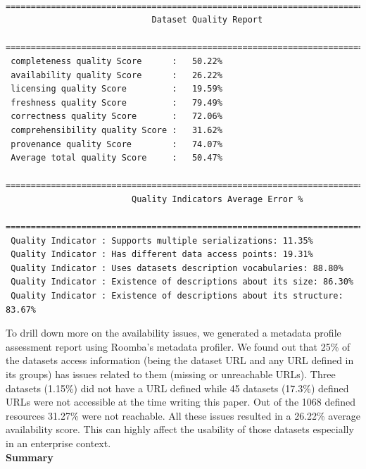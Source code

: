 \documentclass[onecolumn, crcready]{../../Tools/LaTEX/iosart2c}
\begin{document}
\begin{lstlisting}
 =================================================================================
                             Dataset Quality Report
 =================================================================================
 completeness quality Score      :   50.22%
 availability quality Score      :   26.22%
 licensing quality Score         :   19.59%
 freshness quality Score         :   79.49%
 correctness quality Score       :   72.06%
 comprehensibility quality Score :   31.62%
 provenance quality Score        :   74.07%
 Average total quality Score     :   50.47%
 =================================================================================
                         Quality Indicators Average Error %
 =================================================================================
 Quality Indicator : Supports multiple serializations: 11.35%
 Quality Indicator : Has different data access points: 19.31%
 Quality Indicator : Uses datasets description vocabularies: 88.80%
 Quality Indicator : Existence of descriptions about its size: 86.30%
 Quality Indicator : Existence of descriptions about its structure: 83.67%
\end{lstlisting}

To drill down more on the availability issues, we generated a metadata profile assessment report using Roomba's metadata profiler. We found out that 25\% of the datasets access information (being the dataset URL and any URL defined in its groups) has issues related to them (missing or unreachable URLs).
Three datasets (1.15\%) did not have a URL defined while 45 datasets (17.3\%) defined URLs were not accessible at the time writing this paper. Out of the 1068 defined resources 31.27\% were not reachable. All these issues resulted in a 26.22\% average availability score. This can highly affect the usability of those datasets especially in an enterprise context.\\

\textbf{Summary}\\
\end{document}
